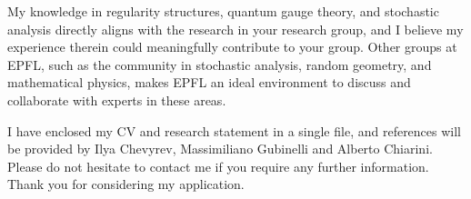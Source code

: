 \documentclass[12pt,a4paper]{moderncv}
\begin{document}
My knowledge in regularity structures, quantum gauge theory, and stochastic analysis directly aligns with the research in your research group, and I believe my experience therein could meaningfully contribute to your group. Other groups at EPFL, such as the community in  stochastic analysis, random geometry, and mathematical physics, makes EPFL an ideal environment to discuss and collaborate with experts in these areas.


I have enclosed my CV and research statement in a single file, and references will be provided by Ilya Chevyrev, Massimiliano Gubinelli and Alberto Chiarini. Please do not hesitate to contact me if you require any further information. Thank you for considering my application. %






\vspace{0.5cm}

\makeletterclosing
\end{document}
